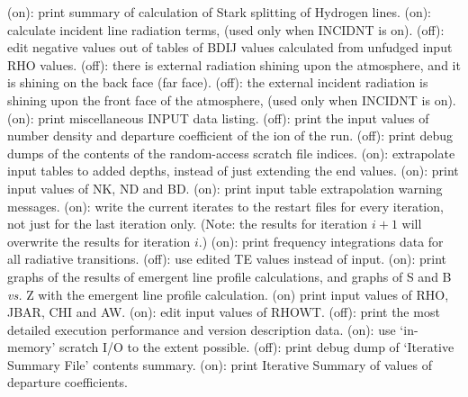 \space \vbox { (on): \bang
print summary of calculation of Stark splitting of Hydrogen lines.}
\space \vbox { (on): \bang
calculate incident line radiation terms, (used only when INCIDNT is on).}
\space \vbox { (off): \bang
edit negative values out of tables of BDIJ values calculated from
unfudged \break input RHO values.}
\space \vbox { (off): \bang
there is external radiation shining upon the atmosphere, and it is
shining on the back face (far face).}
\space \vbox { (off): \bang
the external incident radiation is shining upon the front face of the
atmosphere, (used only when INCIDNT is on).}
\space \vbox { (on): \bang
print miscellaneous INPUT data listing.}
\space \vbox { (off): \bang
print the input values of number density and departure coefficient of the
ion of the run.}
\space \vbox { (off): \bang
print debug dumps of the contents of the random-access scratch file indices.}
\space \vbox { (on): \bang
extrapolate input tables to added depths, instead of just extending the end
values.}
\space \vbox { (on): \bang
print input values of NK, ND and BD.}
\space \vbox { (on): \bang
print input table extrapolation warning messages.}
\space \vbox { (on): \bang
write the current iterates to the restart files for every iteration, not just
for the last iteration only. (Note: the results for iteration $i+1$ will
overwrite the results for iteration $i$.)}
\space \vbox { (on): \bang
print frequency integrations data for all radiative transitions.}
\space \vbox { (off): \bang
use edited TE values instead of input.}
\space \vbox { (on): \bang
print graphs of the results of emergent line profile calculations, and graphs
of S and B {\it vs.} Z with the emergent line profile calculation.}
\space \vbox { (on) \bang
print input values of RHO, JBAR, CHI and AW.}
\space \vbox { (on): \bang
edit input values of RHOWT.}
\space \vbox { (off): \bang
print the most detailed execution performance and version description data.}
\space \vbox { (on): \bang
use `in-memory' scratch I/O to the extent possible.}
\space \vbox { (off): \bang
print debug dump of `Iterative Summary File' contents summary.}
\space \vbox { (on): \bang
print Iterative Summary of values of departure coefficients.}
